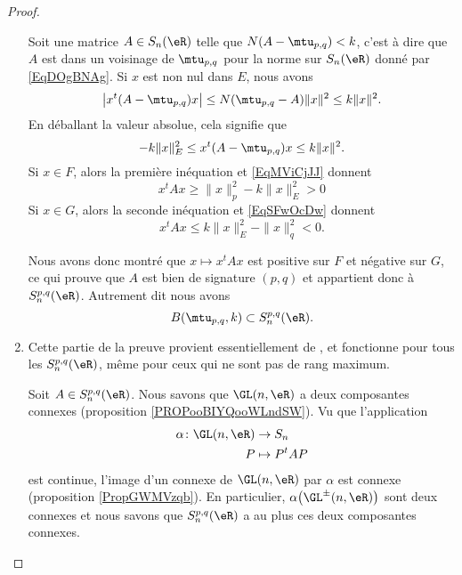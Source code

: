 \begin{proof}
\begin{enumerate}
            Soit une matrice \( A\in S_n(\eR)\) telle que \( N(A-\mtu_{p,q})<k\), c'est à dire que \( A\) est dans un voisinage de \( \mtu_{p,q}\) pour la norme sur \( S_n(\eR)\) donné par \eqref{EqDOgBNAg}. Si \( x\) est non nul dans \( E\), nous avons
            \begin{equation}
                \big| x^t(A-\mtu_{p,q})x \big|\leq N(\mtu_{p,q}-A)\| x \|^2\leq k\| x \|^2.
            \end{equation}
            En déballant la valeur absolue, cela signifie que
            \begin{equation}
                -k\| x \|_E^2\leq x^t(A-\mtu_{p,q})x\leq k\| x \|^2.
            \end{equation}
            Si \( x\in F\), alors la première inéquation et \eqref{EqMViCjJJ} donnent
            \begin{equation}
                x^tAx\geq \| x \|_p^2-k\| x \|_E^2>0
            \end{equation}
            Si \( x\in G\), alors la seconde inéquation et \eqref{EqSFwOcDw} donnent
            \begin{equation}
                x^tAx\leq  k\| x \|_E^2-\| x \|_q^2<0.
            \end{equation}
            
            Nous avons donc montré que \( x\mapsto x^tAx\) est positive sur \( F\) et négative sur \( G\), ce qui prouve que \( A\) est bien de signature \( (p,q)\) et appartient donc à \( S_n^{p,q}(\eR)\). Autrement dit nous avons
            \begin{equation}
                B(\mtu_{p,q},k)\subset S_n^{p,q}(\eR).
            \end{equation}

        \item
            Cette partie de la preuve provient essentiellement de \cite{VKqpMYL}, et fonctionne pour tous les \( S_n^{p,q}(\eR)\), même pour ceux qui ne sont pas de rang maximum. 
            
            Soit \( A\in S_n^{p,q}(\eR)\). Nous savons que \( \GL(n,\eR)\) a deux composantes connexes (proposition \ref{PROPooBIYQooWLndSW}). Vu que l'application 
            \begin{equation}
                \begin{aligned}
                    \alpha\colon \GL(n,\eR)&\to S_n \\
                    P&\mapsto P^tAP 
                \end{aligned}
            \end{equation}
            est continue, l'image d'un connexe de \( \GL(n,\eR)\) par \( \alpha\) est connexe (proposition \ref{PropGWMVzqb}). En particulier, \( \alpha\big( \GL^{\pm}(n,\eR) \big)\) sont deux connexes et nous savons que \( S_n^{p,q}(\eR)\) a au plus ces deux composantes connexes. 


\end{enumerate}
\end{proof}
